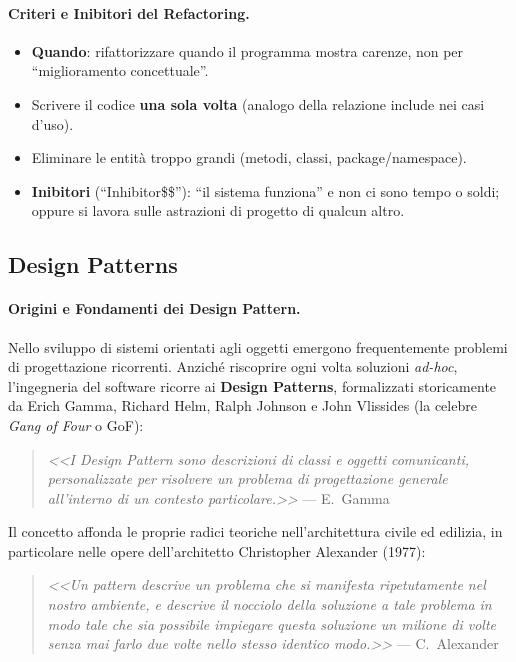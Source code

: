 \documentclass[12pt]{extarticle}
\begin{document}
\paragraph{Criteri e Inibitori del Refactoring.}
\begin{itemize}
    \item \textbf{Quando}: rifattorizzare quando il programma mostra carenze, non per ``miglioramento concettuale''.
    \item Scrivere il codice \textbf{una sola volta} (analogo della relazione \guillemotleft include\guillemotright{} nei casi d'uso).
    \item Eliminare le entità troppo grandi (metodi, classi, package/namespace).
    \item \textbf{Inibitori} (``Inhibitor\$\$''): ``il sistema funziona'' e non ci sono tempo o soldi; oppure si lavora sulle astrazioni di progetto di qualcun altro.
\end{itemize}


\subsection{Design Patterns}

\paragraph{Origini e Fondamenti dei Design Pattern.}
Nello sviluppo di sistemi orientati agli oggetti emergono frequentemente problemi di progettazione ricorrenti. Anziché riscoprire ogni volta soluzioni \textit{ad-hoc}, l'ingegneria del software ricorre ai \textbf{Design Patterns}, formalizzati storicamente da Erich Gamma, Richard Helm, Ralph Johnson e John Vlissides (la celebre \textit{Gang of Four} o GoF):
\begin{quote}
    \textit{<<I Design Pattern sono descrizioni di classi e oggetti comunicanti, personalizzate per risolvere un problema di progettazione generale all'interno di un contesto particolare.>>} --- E.~Gamma
\end{quote}

\noindent Il concetto affonda le proprie radici teoriche nell'architettura civile ed edilizia, in particolare nelle opere dell'architetto Christopher Alexander (1977):
\begin{quote}
    \textit{<<Un pattern descrive un problema che si manifesta ripetutamente nel nostro ambiente, e descrive il nocciolo della soluzione a tale problema in modo tale che sia possibile impiegare questa soluzione un milione di volte senza mai farlo due volte nello stesso identico modo.>>} --- C.~Alexander
\end{quote}
\end{document}
